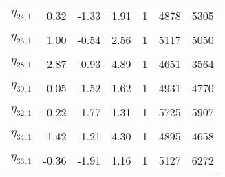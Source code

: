\begin{longtable}[t]{lrrrrrr}
$\eta_{24, 1}$ & 0.32 & -1.33 & 1.91 & 1 & 4878 & 5305\\
\cellcolor{gray!6}{$\eta_{25, 1}$} & \cellcolor{gray!6}{1.68} & \cellcolor{gray!6}{-0.30} & \cellcolor{gray!6}{3.80} & \cellcolor{gray!6}{1} & \cellcolor{gray!6}{4541} & \cellcolor{gray!6}{4510}\\
$\eta_{26, 1}$ & 1.00 & -0.54 & 2.56 & 1 & 5117 & 5050\\
\cellcolor{gray!6}{$\eta_{27, 1}$} & \cellcolor{gray!6}{0.94} & \cellcolor{gray!6}{-0.51} & \cellcolor{gray!6}{2.42} & \cellcolor{gray!6}{1} & \cellcolor{gray!6}{4888} & \cellcolor{gray!6}{2971}\\
$\eta_{28, 1}$ & 2.87 & 0.93 & 4.89 & 1 & 4651 & 3564\\
\cellcolor{gray!6}{$\eta_{29, 1}$} & \cellcolor{gray!6}{-0.52} & \cellcolor{gray!6}{-1.81} & \cellcolor{gray!6}{0.72} & \cellcolor{gray!6}{1} & \cellcolor{gray!6}{4373} & \cellcolor{gray!6}{3431}\\
$\eta_{30, 1}$ & 0.05 & -1.52 & 1.62 & 1 & 4931 & 4770\\
\cellcolor{gray!6}{$\eta_{31, 1}$} & \cellcolor{gray!6}{1.11} & \cellcolor{gray!6}{-1.27} & \cellcolor{gray!6}{3.49} & \cellcolor{gray!6}{1} & \cellcolor{gray!6}{3705} & \cellcolor{gray!6}{2305}\\
$\eta_{32, 1}$ & -0.22 & -1.77 & 1.31 & 1 & 5725 & 5907\\
\cellcolor{gray!6}{$\eta_{33, 1}$} & \cellcolor{gray!6}{2.85} & \cellcolor{gray!6}{0.16} & \cellcolor{gray!6}{6.08} & \cellcolor{gray!6}{1} & \cellcolor{gray!6}{5826} & \cellcolor{gray!6}{4131}\\
$\eta_{34, 1}$ & 1.42 & -1.21 & 4.30 & 1 & 4895 & 4658\\
\cellcolor{gray!6}{$\eta_{35, 1}$} & \cellcolor{gray!6}{0.76} & \cellcolor{gray!6}{-0.87} & \cellcolor{gray!6}{2.45} & \cellcolor{gray!6}{1} & \cellcolor{gray!6}{5231} & \cellcolor{gray!6}{5375}\\
$\eta_{36, 1}$ & -0.36 & -1.91 & 1.16 & 1 & 5127 & 6272\\*
\end{longtable}